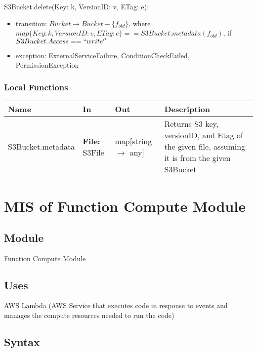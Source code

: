 \documentclass[12pt, titlepage]{article}
\begin{document}
\noindent S3Bucket.delete(Key: k, VersionID: v, ETag: e):
\begin{itemize}
  \item transition: $Bucket \rightarrow Bucket - \{f_{old}\}$, where
    $map\{Key: k, VersionID: v, ETag:
    e\}==S3Bucket.metadata(f_{old})$, if $S3Bucket.Access == ``write''$
  \item exception: ExternalServiceFailure, ConditionCheckFailed,
    PermissionException
\end{itemize}

\subsubsection{Local Functions}

\begin{center}
  \begin{tabular}{>{\raggedright}p{4cm} >{\raggedright}p{3cm}
    >{\raggedright}p{3.5cm} p{5.5cm}}
    \hline
    \textbf{Name} & \textbf{In} & \textbf{Out} & \textbf{Description} \\
    \hline
    S3Bucket.metadata & \textbf{File:} S3File & map[string
    $\rightarrow$ any] & Returns S3 key, versionID, and Etag of the
    given file, assuming it is from the given S3Bucket \\
    \hline
  \end{tabular}
\end{center}

\section{MIS of Function Compute Module} \label{Module}

\subsection{Module}

Function Compute Module

\subsection{Uses}

AWS Lambda (AWS Service that executes code in response to events and
manages the compute resources needed to run the code)

\subsection{Syntax}
\end{document}
